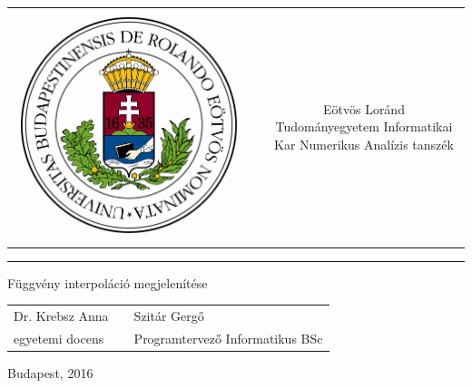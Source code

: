 \documentclass[12pt]{report}
\begin{document}
\begin{titlepage}
\vspace*{0cm}
\centering
\begin{tabular}{cp{2cm}c}
\begin{minipage}{4cm}
\vspace{0pt}
\includegraphics[width=1\textwidth]{pics/eltecimerszines}
\end{minipage} & &
\begin{minipage}{7cm}
\vspace{0pt}Eötvös Loránd Tudományegyetem \vspace{10pt}
\newline Informatikai Kar \vspace{10pt}
\newline Numerikus Analízis tanszék
\end{minipage}
\end{tabular}

\vspace*{0.2cm}
\rule{\textwidth}{1pt}

\vspace*{6cm}
{\Huge Függvény interpoláció megjelenítése}

\vspace*{5cm}
\begin{tabular}{lp{3cm}l}
Dr. Krebsz Anna  & &  Szitár Gergő \\
egyetemi docens & & Programtervező Informatikus BSc
\end{tabular}

\vfill

\vspace*{1cm}
Budapest, 2016
\end{titlepage}
\end{document}
